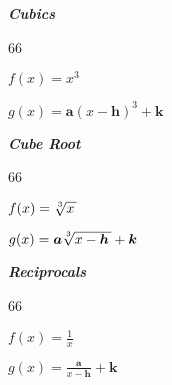 {
    \begin{minipage}{0.2\textwidth}
        \begin{center}
            {\bfseries\itshape Cubics}\\
            \begin{myTikzpictureGrid}{0.25} {6}{6}
            \end{myTikzpictureGrid}
        \end{center}\vspace{-1\onelineskip}
        {$f(x) = x^3$}

        {$g(x) = \bm{a} (x-\bm{h})^3 + \bm{k}$}
    \end{minipage}
}
\hfill 
{
    \begin{minipage}{0.2\textwidth}
        \begin{center}
            {\bfseries\itshape Cube Root}\\
            \begin{myTikzpictureGrid}{0.25} {6}{6}
        \end{myTikzpictureGrid}
    \end{center}\vspace{-1\onelineskip}
    {$f(x) = \myRoot[3]{x}$}

        {$g(x) = \bm{a}\myRoot[3]{x-\bm{h}} + \bm{k}$}
    \end{minipage}
}
\hfill 
{
    \begin{minipage}{0.2\textwidth}
        \begin{center}
            {\bfseries\itshape Reciprocals}\\
            \begin{myTikzpictureGrid}{0.25} {6}{6}
            \end{myTikzpictureGrid}
        \end{center}\vspace{-1\onelineskip}
        {$f(x) = \frac{1}{x}$}

        {$g(x) = \frac{\bm{a}}{x-\bm{h}} + \bm{k}$}
    \end{minipage}
}





